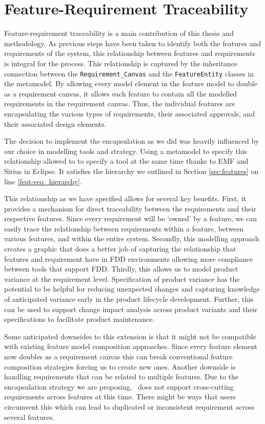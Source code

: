 \section{Feature-Requirement Traceability}

Feature-requirement traceability is a main contribution of this thesis and methodology. As previous steps have been taken to identify both the features and requirements of the system, this relationship between features and requirements is integral for the process. This relationship is captured by the inheritance connection between the \texttt{Requirement\_Canvas} and the \texttt{FeatureEntity} classes in the metamodel. By allowing every model element in the feature model to double as a requirement canvas, it allows each feature to contain all the modelled requirements in the requirement canvas. Thus, the individual features are encapsulating the various types of requirements, their associated approvals, and their associated design elements. 

The decision to implement the encapsulation as we did was heavily influenced by our choice in modelling tools and strategy. Using a metamodel to specify this relationship allowed to to specify a tool at the same time thanks to \ac{EMF} and Sirius in Eclipse. It satisfies the hierarchy we outlined in Section \ref{sec:features} on line \ref{feat-req_hierarchy}.

This relationship as we have specified allows for several key benefits. First, it provides a mechanism for direct traceability between the requirements and their respective features. Since every requirement will be `owned' by a feature, we can easily trace the relationship between requirements within a feature, between various features, and within the entire system. Secondly, this modelling approach creates a graphic that does a better job of capturing the relationship that features and requirement have in \ac{FDD} environments allowing more compliance between tools that support \ac{FDD}. Thirdly, this allows us to model product variance at the requirement level. Specification of product variance has the potential to be helpful for reducing unexpected changes and capturing knowledge of anticipated variance early in the product lifecycle development. Further, this can be used to support change impact analysis across product variants and their specifications to facilitate product maintenance. 

Some anticipated downsides to this extension is that it might not be compatible with existing feature model composition approaches. Since every feature element now doubles as a requirement canvas this can break conventional feature composition strategies forcing us to create new ones. Another downside is handling requirements that can be related to multiple features. Due to the encapsulation strategy we are proposing, \tool\ does not support cross-cutting requirements across features at this time. There might be ways that users circumvent this which can lead to duplicated or inconsistent requirement across several features. 

